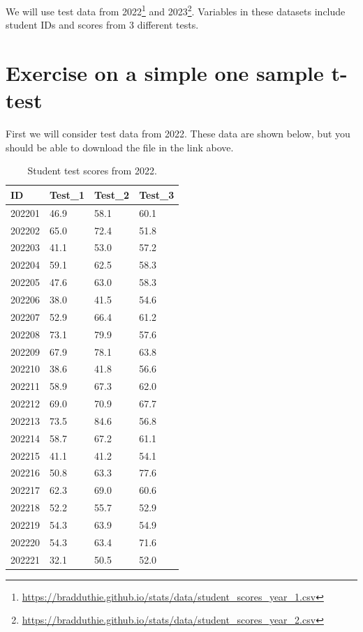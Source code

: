 \documentclass[
]{scrbook}
\begin{document}
We will use test data from 2022\footnote{\url{https://bradduthie.github.io/stats/data/student_scores_year_1.csv}} and 2023\footnote{\url{https://bradduthie.github.io/stats/data/student_scores_year_2.csv}}.
Variables in these datasets include student IDs and scores from 3 different tests.

\hypertarget{exercise-on-a-simple-one-sample-t-test}{%
\section{Exercise on a simple one sample t-test}\label{exercise-on-a-simple-one-sample-t-test}}

First we will consider test data from 2022.
These data are shown below, but you should be able to download the file in the link above.

\begin{table}

\caption{\label{tab:unnamed-chunk-100}Student test scores from 2022.}
\centering
\begin{tabular}[t]{l|l|l|l}
\hline
ID & Test\_1 & Test\_2 & Test\_3\\
\hline
202201 & 46.9 & 58.1 & 60.1\\
\hline
202202 & 65.0 & 72.4 & 51.8\\
\hline
202203 & 41.1 & 53.0 & 57.2\\
\hline
202204 & 59.1 & 62.5 & 58.3\\
\hline
202205 & 47.6 & 63.0 & 58.3\\
\hline
202206 & 38.0 & 41.5 & 54.6\\
\hline
202207 & 52.9 & 66.4 & 61.2\\
\hline
202208 & 73.1 & 79.9 & 57.6\\
\hline
202209 & 67.9 & 78.1 & 63.8\\
\hline
202210 & 38.6 & 41.8 & 56.6\\
\hline
202211 & 58.9 & 67.3 & 62.0\\
\hline
202212 & 69.0 & 70.9 & 67.7\\
\hline
202213 & 73.5 & 84.6 & 56.8\\
\hline
202214 & 58.7 & 67.2 & 61.1\\
\hline
202215 & 41.1 & 41.2 & 54.1\\
\hline
202216 & 50.8 & 63.3 & 77.6\\
\hline
202217 & 62.3 & 69.0 & 60.6\\
\hline
202218 & 52.2 & 55.7 & 52.9\\
\hline
202219 & 54.3 & 63.9 & 54.9\\
\hline
202220 & 54.3 & 63.4 & 71.6\\
\hline
202221 & 32.1 & 50.5 & 52.0\\
\hline
\end{tabular}
\end{table}
\end{document}
